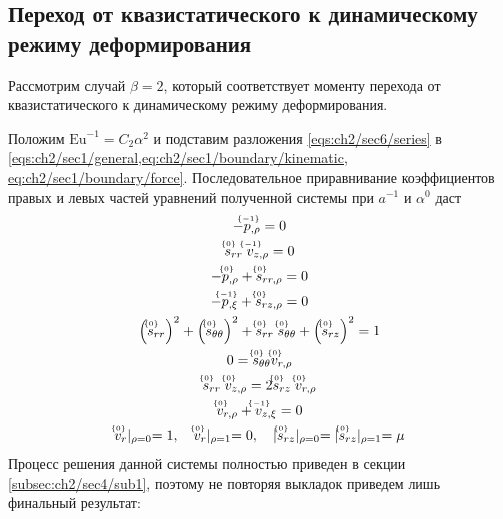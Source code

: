 \subsection{Переход от квазистатического к динамическому режиму деформирования}\label{subsec:ch2/sec6/sub1}

Рассмотрим случай $\beta=2$, который соответствует моменту перехода от квазистатического к динамическому режиму деформирования.

Положим $\text{Eu}^{-1} = C_2 \alpha^2$ и подставим разложения \cref{eqs:ch2/sec6/series} в \cref{eqs:ch2/sec1/general,eq:ch2/sec1/boundary/kinematic, eq:ch2/sec1/boundary/force}. Последовательное приравнивание коэффициентов правых и левых частей уравнений полученной системы при $a^{-1}$ и $\alpha^0$ даст
\begin{subequations}
  \label{eqs:ch2/sec6/sub1/main/int}
  \begin{gather}
    \label{eqs:ch2/sec6/sub1/-1/motion:2}
    -\uindex{p}{-1}_{,\rho} = 0
    \\
    \label{eqs:ch2/sec6/sub1/-1/coax:2}
    \uindex{s}{0}_{rr} \; \uindex{v}{-1}_{z,\rho} = 0
    \\
    \label{eqs:ch2/sec6/sub1/0/motion:1}
    -\uindex{p}{0}_{,\rho}+\uindex{s}{0}_{rr,\rho} = 0
    \\
    \label{eqs:ch2/sec6/sub1/0/motion:2}
    -\uindex{p}{-1}_{,\xi} + \uindex{s}{0}_{rz,\rho} = 0
    \\
    \label{eqs:ch2/sec6/sub1/0/plasticity}
    \left(\uindex{s}{0}_{rr}\right)^2 + \left(\uindex{s}{0}_{\theta\theta}\right)^2 + \uindex{s}{0}_{rr}\; \uindex{s}{0}_{\theta\theta} + \left(\uindex{s}{0}_{rz}\right)^2 = 1
    \\
    \label{eqs:ch2/sec6/sub1/0/coax:1}
    0 = \uindex{s}{0}_{\theta\theta} \uindex{v}{0}_{r,\rho}
    \\
    \label{eqs:ch2/sec6/sub1/0/coax:2}
    \uindex{s}{0}_{rr} \; \uindex{v}{0}_{z,\rho} = 2 \uindex{s}{0}_{rz} \; \uindex{v}{0}_{r,\rho}
    \\
    \label{eqs:ch2/sec6/sub1/0/uncompress}
    \uindex{v}{0}_{r,\rho} + \uindex{v}{-1}_{z,\xi} = 0
    \\
    \label{eq:ch2/sec6/sub1/boundary/0}
    \uindex{v}{0}_{r}\lvert_{\rho=0} = 1,\quad \uindex{v}{0}_{r}\lvert_{\rho=1} = 0, \quad \lvert \uindex{s}{0}_{rz}\lvert_{\rho=0} = \lvert \uindex{s}{0}_{rz}\lvert_{\rho=1} = \mu
  \end{gather}
\end{subequations}
Процесс решения данной системы полностью приведен в секции \cref{subsec:ch2/sec4/sub1}, поэтому не повторяя выкладок приведем лишь финальный результат:
